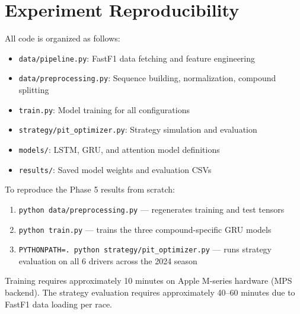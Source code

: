 \documentclass[12pt]{article}
\begin{document}
\appendix
\section{Experiment Reproducibility}

All code is organized as follows:

\begin{itemize}[noitemsep]
    \item \texttt{data/pipeline.py}: FastF1 data fetching and feature engineering
    \item \texttt{data/preprocessing.py}: Sequence building, normalization, compound splitting
    \item \texttt{train.py}: Model training for all configurations
    \item \texttt{strategy/pit\_optimizer.py}: Strategy simulation and evaluation
    \item \texttt{models/}: LSTM, GRU, and attention model definitions
    \item \texttt{results/}: Saved model weights and evaluation CSVs
\end{itemize}

To reproduce the Phase 5 results from scratch:
\begin{enumerate}[noitemsep]
    \item \texttt{python data/preprocessing.py} --- regenerates training and test tensors
    \item \texttt{python train.py} --- trains the three compound-specific GRU models
    \item \texttt{PYTHONPATH=. python strategy/pit\_optimizer.py} --- runs strategy evaluation on all 6 drivers across the 2024 season
\end{enumerate}

Training requires approximately 10 minutes on Apple M-series hardware (MPS backend). The strategy evaluation requires approximately 40--60 minutes due to FastF1 data loading per race.
\end{document}

